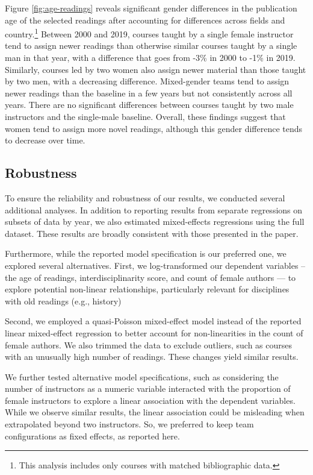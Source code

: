\documentclass[
  12pt,
]{article}
\begin{document}
Figure \ref{fig:age-readings} reveals significant gender differences in the publication age of the selected readings after accounting for differences across fields and country.\footnote{This analysis includes only courses with matched bibliographic data.} Between 2000 and 2019, courses taught by a single female instructor tend to assign newer readings than otherwise similar courses taught by a single man in that year, with a difference that goes from -3\% in 2000 to -1\% in 2019. Similarly, courses led by two women also assign newer material than those taught by two men, with a decreasing difference. Mixed-gender teams tend to assign newer readings than the baseline in a few years but not consistently across all years. There are no significant differences between courses taught by two male instructors and the single-male baseline. Overall, these findings suggest that women tend to assign more novel readings, although this gender difference tends to decrease over time.

\subsection{Robustness}\label{robustness}

To ensure the reliability and robustness of our results, we conducted several additional analyses. In addition to reporting results from separate regressions on subsets of data by year, we also estimated mixed-effects regressions using the full dataset. These results are broadly consistent with those presented in the paper.

Furthermore, while the reported model specification is our preferred one, we explored several alternatives. First, we log-transformed our dependent variables -- the age of readings, interdisciplinarity score, and count of female authors --- to explore potential non-linear relationships, particularly relevant for disciplines with old readings (e.g., history)

Second, we employed a quasi-Poisson mixed-effect model instead of the reported linear mixed-effect regression to better account for non-linearities in the count of female authors. We also trimmed the data to exclude outliers, such as courses with an unusually high number of readings. These changes yield similar results.

We further tested alternative model specifications, such as considering the number of instructors as a numeric variable interacted with the proportion of female instructors to explore a linear association with the dependent variables. While we observe similar results, the linear association could be misleading when extrapolated beyond two instructors. So, we preferred to keep team configurations as fixed effects, as reported here.
\end{document}
